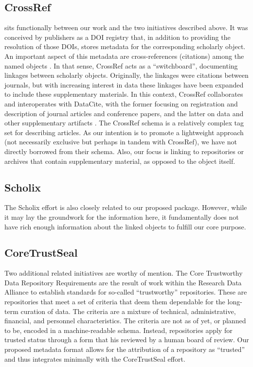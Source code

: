 \subsection{CrossRef}
  sits functionally between our work and the two initiatives described above.  It was conceived by publishers as a DOI registry that, in addition to providing the resolution of those DOIs, stores metadata for the corresponding scholarly object.  An important aspect of this metadata are cross-references (citations) among the named objects \parencite{CrossRefRelationshipsDOIsother}.  In that sense, CrossRef acts as a ``switchboard'', documenting linkages between scholarly objects. Originally, the linkages were citations between journals, but with increasing interest in data these linkages have been expanded to include these supplementary materials.  In this context, CrossRef collaborates and interoperates with DataCite, with the former focusing on registration and description of journal articles and conference papers, and the latter on data and other supplementary artifacts .  The CrossRef schema is a relatively complex tag set for describing articles.  As our intention is to promote a lightweight approach (not necessarily exclusive but perhaps in tandem with CrossRef), we have not directly borrowed from their schema.  Also, our focus is linking to repositories or archives that contain supplementary material, as opposed to the object itself.

\subsection{Scholix}
The Scholix effort \parencite{BurtonScholixMetadataSchema2017} is also closely related to our proposed package. However, while it may lay the groundwork for the information here, it fundamentally does not have rich enough information about the linked objects to fulfill our core purpose.

\subsection{CoreTrustSeal}
Two additional related initiatives are worthy of mention.   The Core Trustworthy Data Repository Requirements \parencite{CoreTrustSealDataRepositoriesRequirements2017} are the result of work within the Research Data Alliance to establish standards for so-called ``trustworthy'' repositories.  These are repositories that meet a set of criteria that deem them dependable for the long-term curation of data.  The criteria are a mixture of technical, administrative, financial, and personnel characteristics.  The criteria are not as of yet, or planned to be, encoded in a machine-readable schema.  Instead, repositories apply for trusted status through a form that his reviewed by a human board of review.  Our proposed metadata format allows for the attribution of a repository as ``trusted'' and thus integrates minimally with the CoreTrustSeal effort.

